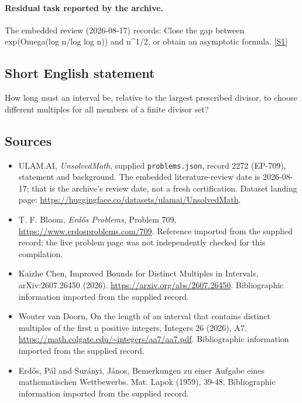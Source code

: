 \documentclass[11pt,a4paper]{article}
\newcommand{\sref}[2]{\hyperlink{source:#1:#2}{[S#2]}}
\begin{document}
\paragraph{Residual task reported by the archive.}

The embedded review (2026-08-17) records: Close the gap between exp(Omega(log n/log log n)) and n\textasciicircum{}{1/2}, or obtain an asymptotic formula. \sref{2272}{1}

\subsection{Short English statement}

How long must an interval be, relative to the largest prescribed divisor, to choose different multiples for all members of a finite divisor set?

\subsection{Sources}

{\small

\begin{itemize}

\item[\hypertarget{source:2272:1}{S1}] ULAM.AI, \emph{UnsolvedMath}, supplied \texttt{problems.json}, record 2272 (EP-709), statement and background. The embedded literature-review date is 2026-08-17; that is the archive’s review date, not a fresh certification. Dataset landing page: \url{https://huggingface.co/datasets/ulamai/UnsolvedMath}.

\item[\hypertarget{source:2272:2}{S2}] T. F. Bloom, \emph{Erdős Problems}, Problem 709, \url{https://www.erdosproblems.com/709}. Reference imported from the supplied record; the live problem page was not independently checked for this compilation.

\item[\hypertarget{source:2272:3}{S3}] Kaizhe Chen, Improved Bounds for Distinct Multiples in Intervals, arXiv:2607.26450 (2026). \url{https://arxiv.org/abs/2607.26450}. Bibliographic information imported from the supplied record.

\item[\hypertarget{source:2272:4}{S4}] Wouter van Doorn, On the length of an interval that contains distinct multiples of the first n positive integers, Integers 26 (2026), A7. \url{https://math.colgate.edu/~integers/aa7/aa7.pdf}. Bibliographic information imported from the supplied record.

\item[\hypertarget{source:2272:5}{S5}] Erd\H{o}s, P\'{a}l and Sur\'{a}nyi, J\'{a}nos, Bemerkungen zu einer Aufgabe eines mathematischen {W}ettbewerbs. Mat. Lapok (1959), 39-48. Bibliographic information imported from the supplied record.

\end{itemize}

}

\label{end:2272}
\end{document}
